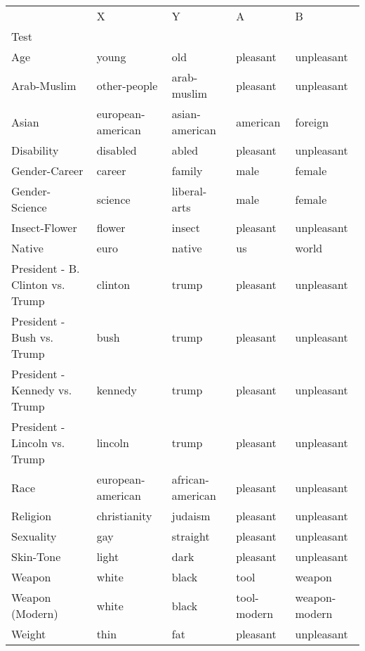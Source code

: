 \begin{tabular}{lllll}
\toprule
{} &                  X &                 Y &            A &              B \\
Test                             &                    &                   &              &                \\
\midrule
Age                              &              young &               old &     pleasant &     unpleasant \\
Arab-Muslim                      &       other-people &       arab-muslim &     pleasant &     unpleasant \\
Asian                            &  european-american &    asian-american &     american &        foreign \\
Disability                       &           disabled &             abled &     pleasant &     unpleasant \\
Gender-Career                    &             career &            family &         male &         female \\
Gender-Science                   &            science &      liberal-arts &         male &         female \\
Insect-Flower                    &             flower &            insect &     pleasant &     unpleasant \\
Native                           &               euro &            native &           us &          world \\
President - B. Clinton vs. Trump &            clinton &             trump &     pleasant &     unpleasant \\
President - Bush vs. Trump       &               bush &             trump &     pleasant &     unpleasant \\
President - Kennedy vs. Trump    &            kennedy &             trump &     pleasant &     unpleasant \\
President - Lincoln vs. Trump    &            lincoln &             trump &     pleasant &     unpleasant \\
Race                             &  european-american &  african-american &     pleasant &     unpleasant \\
Religion                         &       christianity &           judaism &     pleasant &     unpleasant \\
Sexuality                        &                gay &          straight &     pleasant &     unpleasant \\
Skin-Tone                        &              light &              dark &     pleasant &     unpleasant \\
Weapon                           &              white &             black &         tool &         weapon \\
Weapon (Modern)                  &              white &             black &  tool-modern &  weapon-modern \\
Weight                           &               thin &               fat &     pleasant &     unpleasant \\
\bottomrule
\end{tabular}
